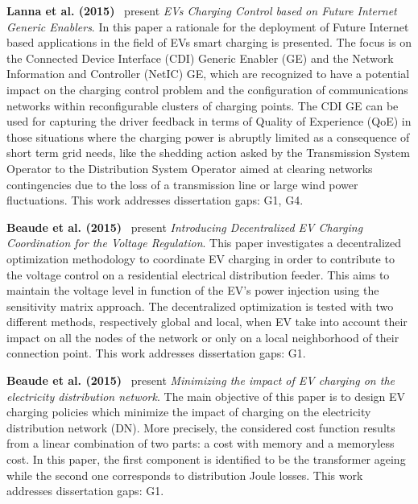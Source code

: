 \documentclass[letterpaper, 12pt, oneside, doublespacing]{Thesis}
\begin{document}
\noindent \textbf{Lanna et al. (2015)}~\cite{electric_vehicles_2015} present \textit{EVs Charging Control based on Future Internet Generic Enablers}. In this paper a rationale for the deployment of Future Internet based applications in the field of EVs smart charging is presented. The focus is on the Connected Device Interface (CDI) Generic Enabler (GE) and the Network Information and Controller (NetIC) GE, which are recognized to have a potential impact on the charging control problem and the configuration of communications networks within reconfigurable clusters of charging points. The CDI GE can be used for capturing the driver feedback in terms of Quality of Experience (QoE) in those situations where the charging power is abruptly limited as a consequence of short term grid needs, like the shedding action asked by the Transmission System Operator to the Distribution System Operator aimed at clearing networks contingencies due to the loss of a transmission line or large wind power fluctuations. This work addresses dissertation gaps: G1, G4.



\noindent \textbf{Beaude et al. (2015)}~\cite{introducing_decentralized_2015} present \textit{Introducing Decentralized EV Charging Coordination for the Voltage Regulation}. This paper investigates a decentralized optimization methodology to coordinate EV charging in order to contribute to the voltage control on a residential electrical distribution feeder. This aims to maintain the voltage level in function of the EV's power injection using the sensitivity matrix approach. The decentralized optimization is tested with two different methods, respectively global and local, when EV take into account their impact on all the nodes of the network or only on a local neighborhood of their connection point. This work addresses dissertation gaps: G1.



\noindent \textbf{Beaude et al. (2015)}~\cite{introducing_decentralized_2015} present \textit{Minimizing the impact of EV charging on the electricity distribution network}. The main objective of this paper is to design EV charging policies which minimize the impact of charging on the electricity distribution network (DN). More precisely, the considered cost function results from a linear combination of two parts: a cost with memory and a memoryless cost. In this paper, the first component is identified to be the transformer ageing while the second one corresponds to distribution Joule losses. This work addresses dissertation gaps: G1.
\end{document}
